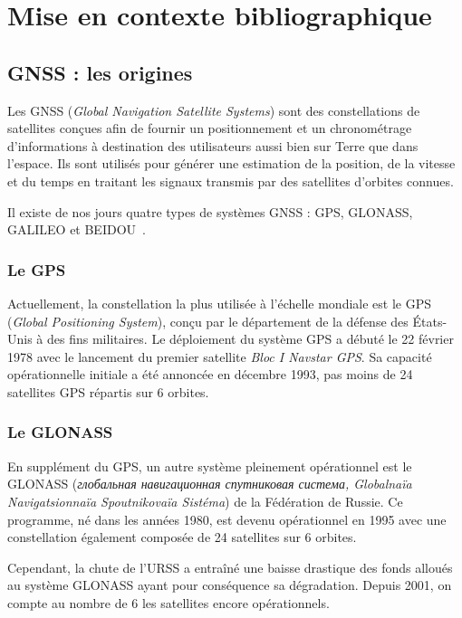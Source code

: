 \section{Mise en contexte bibliographique}\label{sec:mise-en-contexte-bibliographique}
   \subsection{GNSS : les origines}\label{subsec:gnss-les-origines}
      Les GNSS (\textit{Global Navigation Satellite Systems}) sont des constellations de satellites conçues afin de fournir un positionnement et un chronométrage d'informations à destination des utilisateurs aussi bien sur Terre que dans l'espace.
      Ils sont utilisés pour générer une estimation de la position, de la vitesse et du temps en traitant les signaux transmis par des satellites d'orbites connues.

      Il existe de nos jours quatre types de systèmes GNSS : GPS, GLONASS, GALILEO et BEIDOU~\cite{gebre-egziabherGNSSApplicationsMethods2009}.

      \subsubsection{Le GPS}
         Actuellement, la constellation la plus utilisée à l'échelle mondiale est le GPS (\textit{Global Positioning System}), conçu par le département de la défense des États-Unis à des fins militaires.
         Le déploiement du système GPS a débuté le 22 février 1978 avec le lancement du premier satellite \textit{Bloc I Navstar GPS}.
         Sa capacité opérationnelle initiale a été annoncée en décembre 1993, pas moins de 24 satellites GPS répartis sur 6 orbites.

      \subsubsection{Le GLONASS}
         En supplément du GPS, un autre système pleinement opérationnel est le GLONASS (\textit{\foreignlanguage{russian}{глобальная навигационная спутниковая система}, Globalnaïa Navigatsionnaïa Spoutnikovaïa Sistéma}) de la Fédération de Russie.
         Ce programme, né dans les années 1980, est devenu opérationnel en 1995 avec une constellation également composée de 24 satellites sur 6 orbites.

         Cependant, la chute de l'URSS a entraîné une baisse drastique des fonds alloués au système GLONASS ayant pour conséquence sa dégradation.
         Depuis 2001, on compte au nombre de 6 les satellites encore opérationnels.

